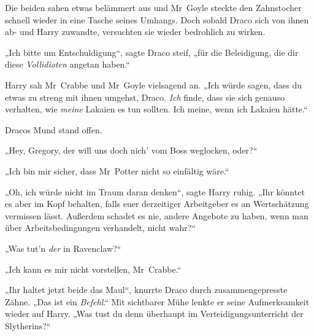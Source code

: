 Die beiden sahen etwas belämmert aus und Mr~Goyle steckte den Zahnstocher schnell wieder in eine Tasche seines Umhangs. Doch sobald Draco sich von ihnen ab- und Harry zuwandte, versuchten sie wieder bedrohlich zu wirken.

„Ich bitte um Entschuldigung“, sagte Draco steif, „für die Beleidigung, die dir diese \emph{Vollidioten} angetan haben.“

Harry sah Mr~Crabbe und Mr~Goyle vielsagend an.
„Ich würde sagen, dass du etwas zu streng mit ihnen umgehst, Draco. \emph{Ich} finde, dass sie sich genauso verhalten, wie \emph{meine} Lakaien es tun sollten. Ich meine, wenn ich Lakaien hätte.“

Dracos Mund stand offen.

„Hey, Gregory, der will uns doch nich’ vom Boss weglocken, oder?“

„Ich bin mir sicher, dass Mr~Potter nicht so einfältig wäre.“

„Oh, ich würde nicht im Traum daran denken“, sagte Harry ruhig.
„Ihr könntet es aber im Kopf behalten, falls euer derzeitiger Arbeitgeber es an Wertschätzung vermissen lässt. Außerdem schadet es nie, andere Angebote zu haben, wenn man über Arbeitsbedingungen verhandelt, nicht wahr?“

„Was tut’n \emph{der} in Ravenclaw?“

„Ich kann es mir nicht vorstellen, Mr~Crabbe.“

„Ihr haltet jetzt beide das Maul“, knurrte Draco durch zusammengepresste Zähne.
„Das ist ein \emph{Befehl}.“ Mit sichtbarer Mühe lenkte er seine Aufmerksamkeit wieder auf Harry.
„Was tust du denn überhaupt im Verteidigungsunterricht der Slytherins?“

